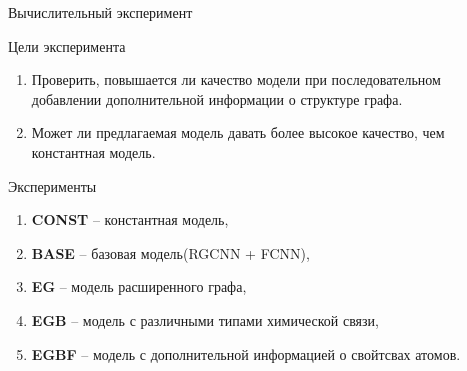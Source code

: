 \documentclass[11pt,pdf,hyperref={unicode}]{beamer}
\begin{document}
\begin{frame}{Вычислительный эксперимент}

\begin{block}{Цели эксперимента}
\begin{enumerate}
    \item Проверить, повышается ли качество модели при последовательном добавлении дополнительной информации о структуре графа.
    \item Может ли предлагаемая модель давать более высокое качество, чем константная модель.
\end{enumerate}

\end{block}

\begin{block}{Эксперименты}

\begin{enumerate}
    \item \textbf{CONST} -- константная модель,
    \item \textbf{BASE} -- базовая модель(RGCNN + FCNN),
    \item \textbf{EG} -- модель расширенного графа,
    \item \textbf{EGB} -- модель с различными типами химической связи,
    \item \textbf{EGBF} -- модель с дополнительной информацией о свойтсвах атомов.
\end{enumerate}

\end{block}


\end{frame}
\end{document}
